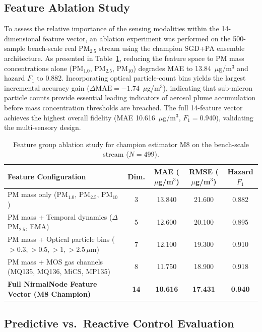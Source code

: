 \documentclass[12pt,a4paper]{article}
\newcommand{\ugsm}{$\mu$g/m$^3$}
\begin{document}
\subsection{Feature Ablation Study}
\label{sec:ablation}

To assess the relative importance of the sensing modalities within the 14-dimensional feature vector, an ablation experiment was performed on the 500-sample bench-scale real PM$_{2.5}$ stream using the champion SGD+PA ensemble architecture. As presented in Table~\ref{tab:ablation}, reducing the feature space to PM mass concentrations alone (PM$_{1.0}$, PM$_{2.5}$, PM$_{10}$) degrades MAE to 13.84~\ugsm{} and hazard $F_1$ to 0.882. Incorporating optical particle-count bins yields the largest incremental accuracy gain ($\Delta\text{MAE} = -1.74$~\ugsm), indicating that sub-micron particle counts provide essential leading indicators of aerosol plume accumulation before mass concentration thresholds are breached. The full 14-feature vector achieves the highest overall fidelity (MAE 10.616~\ugsm, $F_1 = 0.940$), validating the multi-sensory design.

\begin{table}[htbp]
\centering
\caption{Feature group ablation study for champion estimator M8 on the bench-scale stream ($N=499$).}
\label{tab:ablation}
\footnotesize
\begin{tabular}{@{}lcccc@{}}
\toprule
\textbf{Feature Configuration} & \textbf{Dim.} & \textbf{MAE (\ugsm)} & \textbf{RMSE (\ugsm)} & \textbf{Hazard $F_1$} \\
\midrule
PM mass only (PM$_{1.0}$, PM$_{2.5}$, PM$_{10}$)         & 3  & 13.840 & 21.600 & 0.882 \\
PM mass + Temporal dynamics ($\Delta$PM$_{2.5}$, EMA)    & 5  & 12.600 & 20.100 & 0.895 \\
PM mass + Optical particle bins ($>0.3, >0.5, >1, >2.5\,\mu$m) & 7  & 12.100 & 19.300 & 0.910 \\
PM mass + MOS gas channels (MQ135, MQ136, MiCS, MP135)   & 8  & 11.750 & 18.900 & 0.918 \\
\textbf{Full NirmalNode Feature Vector (M8 Champion)}    & \textbf{14} & \textbf{10.616} & \textbf{17.431} & \textbf{0.940} \\
\bottomrule
\end{tabular}
\end{table}

\subsection{Predictive vs.\ Reactive Control Evaluation}
\label{sec:pred-vs-react}
\end{document}
